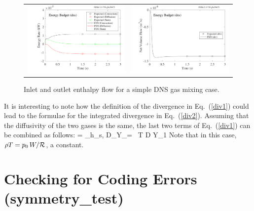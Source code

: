 \documentclass[11pt]{book}
\begin{document}
\begin{figure}[ht]
\begin{tabular*}{\textwidth}{lr}
\includegraphics[width=3.2in]{SCRIPT_FIGURES/energy_budget_dns_heat} &
\includegraphics[width=3.2in]{SCRIPT_FIGURES/energy_budget_dns_div}
\end{tabular*}
\caption[Energy conservation for a DNS case.]{Inlet and outlet enthalpy flow for a simple DNS gas mixing case.}
\label{energy_budget_dns}
\end{figure}

\noindent
It is interesting to note how the definition of the divergence in Eq.~(\ref{div1}) could lead to the formulae for the integrated divergence in Eq.~(\ref{div2}). Assuming that the
diffusivity of the two gases is the same, the last two terms of Eq.~(\ref{div1}) can be combined as follows:
\be \nabla \cdot \bu = 
   \sum_\alpha \nabla h_{s,\alpha} \cdot \rho D_\alpha \nabla Y_\alpha =  \, \nabla T \cdot \rho D \nabla Y_1
  \label{div3} \ee
Note that in this case, $\rho T = p_0 \, W/\cal R$, a constant.


\clearpage

\section{Checking for Coding Errors (\texorpdfstring{{\bf symmetry\_test}}{symmetry\_test})}
\end{document}
